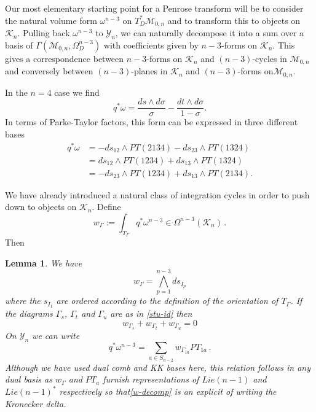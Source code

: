 \documentclass[11pt]{article}
\newcommand{\cK}{\mathcal{K}}
\newcommand{\cM}{\mathcal{M}}
\newcommand{\cY}{\mathcal{Y}}
\newcommand{\1}{{\rm 1\hskip-0.25em I}}
\newtheorem{lemma}{Lemma}[section]
\begin{document}
Our most elementary starting point for a Penrose transform will be to consider the natural volume form $\omega^{n-3}$ on $T^*_D\cM_{0,n}$ and to transform this to objects on $\cK_n$. Pulling back $\omega^{n-3}$ to $\cY_n$, we can  naturally decompose it into a sum over  a basis of $\Gamma(\cM_{0,n},\Omega^{n-3}_D)$ with coefficients given by $n-3$-forms on $\cK_n$.  This gives a correspondence between $n-3$-forms on $\cK_n$ and $(n-3)$-cycles in $\cM_{0,n}$ and conversely between $(n-3)$-planes in $\cK_n$ and $(n-3)$-forms on$\cM_{0,n}$.


In the $n=4$  case we find
$$
q^*\omega = \frac{ds\wedge d\sigma}{\sigma} - \frac{dt\wedge d\sigma}{1-\sigma}.
$$
In terms of Parke-Taylor factors, this form can be expressed in three  different bases
\begin{align}
q^* \omega & = -ds_{12} \wedge PT(2134) - ds_{23} \wedge PT(1324) \nonumber\\
& = ds_{12}\wedge PT(1234) + ds_{13}\wedge PT(1324)\nonumber\\
& = -ds_{23}\wedge PT(1234) + ds_{13}\wedge PT(2134).
\end{align}




We have already introduced a natural class of integration cycles in order to push down to objects on $\cK_n$.  
Define
\begin{equation}  
w_\Gamma:=\int_{T_\Gamma} q^* \omega^{n-3} \in \Omega^{n-3}(\cK_n)\, .\label{WG-def}
\end{equation}
Then
\begin{lemma}  We have
\begin{equation}
w_\Gamma=\bigwedge_{p=1}^{n-3} ds_{I_p} \label{WG-Kn}
\end{equation}
where the $s_{I_1}$ are ordered according to the definition of the orientation of $T_\Gamma$.  If the diagrams $\Gamma_s$, $\Gamma_t$ and $\Gamma_u$ are as in \eqref{stu-id} then \begin{equation}
 w_{\Gamma_s}+w_{\Gamma_t}+w_{\Gamma_u}=0 \label{WG-stu}
\end{equation}
On $\cY_n$ we can write
\begin{equation}
q^*\omega^{n-3}=\sum_{a\in S_{n-2}} w_{\Gamma_{1a}}  PT_{1a}\, .
\label{w-decomp}
\end{equation}
Although we have used dual comb and KK bases here, this relation follows in any dual basis as $w_\Gamma$ and $PT_a$ furnish representations of $Lie(n-1)$ and $Lie(n-1)^*$ respectively so that\eqref{w-decomp} is an explicit of writing the Kronecker delta.
\end{lemma}
\end{document}
